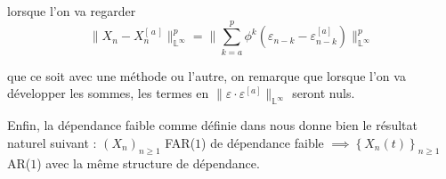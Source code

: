 lorsque l'on va regarder 
$${\lVert {X_n} - {X_n^{[\, a \, ]}} } \rVert_{{\mathds L} ^\infty}^p= \lVert \sum\limits_{k=a}^p \phi^k( \varepsilon_{n-k} - \varepsilon_{n-k}^{[a]}) \rVert_{{\mathds L} ^\infty}^p$$

que ce soit avec une méthode ou l'autre, on remarque que lorsque l'on va développer les sommes, les termes en $\lVert{\varepsilon \cdot \varepsilon^{[a]}}\rVert_{\mathds L^\infty}$ seront nuls.

Enfin, la dépendance faible comme définie dans \cite{maissoro-SmoothnessFTSweakDep} nous donne bien le résultat naturel suivant : $(X_n)_{n \geq 1}$ FAR($1$) de dépendance faible $\implies \left\{ X_n(t) \right\}_{n \geq 1}$ AR($1$) avec la même structure de dépendance.